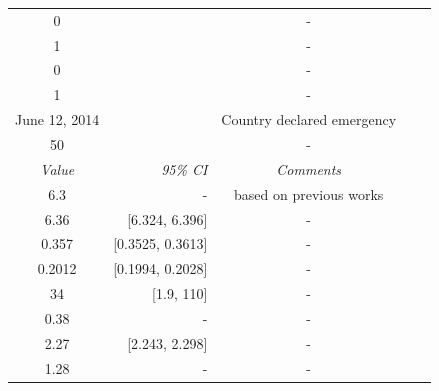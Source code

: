 \documentclass[10pt, journal,onecolumn]{IEEEtran}
\begin{document}
\begin{appendix}
\begin{table}[h]
{\begin{tabular}{@{}crccc@{}}
0& & -\\
1& & -\\
0& & -\\
1& &-\\
June 12, 2014 &  & Country declared emergency\\
50 & & -\\
\cmidrule{1-3}
\textit{Value} & \textit{95\% CI} & \textit{Comments} \\
\midrule
6.3 & - & based on previous works \cite{}\\
6.36 & [6.324, 6.396] & -\\
0.357 & [0.3525, 0.3613] & -\\
0.2012 & [0.1994, 0.2028] & -\\
34 & [1.9, 110] & -\\
0.38 & - & -\\
2.27 &[2.243, 2.298] &-\\
1.28 & - &-\\
\end{tabular}
}
\end{table}



\end{appendix}
\end{document}
